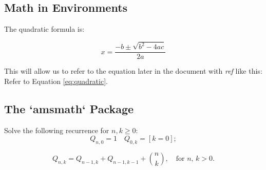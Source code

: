 \documentclass{article}
\newcommand{\cmd}[1]{\textit{#1}}
\begin{document}
\subsection{Math in Environments}

The quadratic formula is:

\begin{equation}
x = \frac{-b \pm \sqrt{b^2 - 4ac}}{2a}
\label{eq:quadratic}
\end{equation}

This will allow us to refer to the equation later in the document with \cmd{ref} like this:
Refer to Equation \ref{eq:quadratic}.

\subsection{The `amsmath` Package}

Solve the following recurrence for $ n,k\geq 0 $:
\[
Q_{n,0} = 1   \quad Q_{0,k} = [k=0];
\]

\[
Q_{n,k} = Q_{n-1,k}+Q_{n-1,k-1}+\binom{n}{k}, \quad\text{for $n$, $k>0$.}
\]
\end{document}
